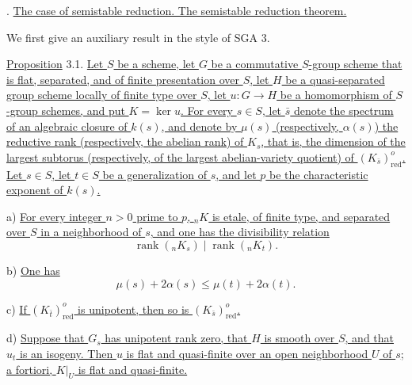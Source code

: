
\medskip
{}. \underline{The case of semistable reduction.  The semistable reduction
theorem.}

We first give an auxiliary result in the style of SGA 3.

\medskip
\noindent
\underline{Proposition} 3.1. \underline{Let $S$ be a scheme, let $G$ be a
commutative $S$-group scheme that is flat, separated, and of finite
presentation over $S$, let $H$ be a quasi-separated group scheme locally of
finite type over $S$, let $u:G\longrightarrow H$ be a homomorphism of
$S$-group schemes, and put $K=\ker u$.  For every $s\in S$, let $\bar s$
denote the spectrum of an algebraic closure of $k(s)$, and denote by
$\mu(s)$ (respectively, $\alpha(s)$) the reductive rank (respectively, the
abelian rank) of $K_s$, that is, the dimension of the largest subtorus
(respectively, of the largest abelian-variety quotient) of
$(K_{\bar s})^o_{\mathrm{red}}$.  Let $s\in S$, let $t\in S$ be a
generalization of $s$, and let $p$ be the characteristic exponent of
$k(s)$.}

\smallskip
\noindent
a) \underline{For every integer $n>0$ prime to $p$, ${}_nK$ is etale, of
finite type, and separated over $S$ in a neighborhood of $s$, and one has
the divisibility relation}
\begin{equation}\tag{3.1.1}
 \operatorname{rank}({}_nK_s)\mid \operatorname{rank}({}_nK_t).
\end{equation}

\noindent
b) \underline{One has}
\begin{equation}\tag{3.1.2}
 \mu(s)+2\alpha(s)\leq \mu(t)+2\alpha(t).
\end{equation}

\noindent
c) \underline{If $(K_{\bar t})^o_{\mathrm{red}}$ is unipotent, then so is
$(K_{\bar s})^o_{\mathrm{red}}$.}

\smallskip
\noindent
d) \underline{Suppose that $G_s$ has unipotent rank zero, that $H$ is smooth
over $S$, and that $u_t$ is an isogeny.  Then $u$ is flat and quasi-finite
over an open neighborhood $U$ of $s$; a fortiori, $K|_U$ is flat and
quasi-finite.}

